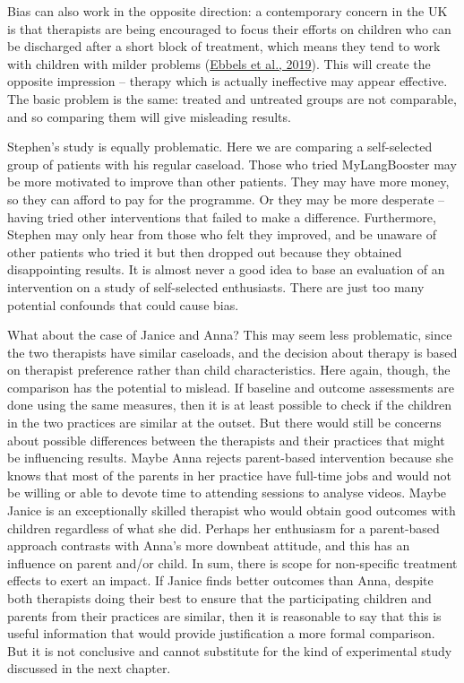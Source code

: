 \documentclass{krantz}
\begin{document}
Bias can also work in the opposite direction: a contemporary concern in the UK is that therapists are being encouraged to focus their efforts on children who can be discharged after a short block of treatment, which means they tend to work with children with milder problems (\protect\hyperlink{ref-ebbels2019}{Ebbels et al., 2019}). This will create the opposite impression -- therapy which is actually ineffective may appear effective. The basic problem is the same: treated and untreated groups are not comparable, and so comparing them will give misleading results.

Stephen's study is equally problematic. Here we are comparing a self-selected group of patients with his regular caseload. Those who tried MyLangBooster may be more motivated to improve than other patients. They may have more money, so they can afford to pay for the programme. Or they may be more desperate -- having tried other interventions that failed to make a difference. Furthermore, Stephen may only hear from those who felt they improved, and be unaware of other patients who tried it but then dropped out because they obtained disappointing results. It is almost never a good idea to base an evaluation of an intervention on a study of self-selected enthusiasts. There are just too many potential confounds that could cause bias.

What about the case of Janice and Anna? This may seem less problematic, since the two therapists have similar caseloads, and the decision about therapy is based on therapist preference rather than child characteristics. Here again, though, the comparison has the potential to mislead. If baseline and outcome assessments are done using the same measures, then it is at least possible to check if the children in the two practices are similar at the outset. But there would still be concerns about possible differences between the therapists and their practices that might be influencing results. Maybe Anna rejects parent-based intervention because she knows that most of the parents in her practice have full-time jobs and would not be willing or able to devote time to attending sessions to analyse videos. Maybe Janice is an exceptionally skilled therapist who would obtain good outcomes with children regardless of what she did. Perhaps her enthusiasm for a parent-based approach contrasts with Anna's more downbeat attitude, and this has an influence on parent and/or child. In sum, there is scope for non-specific treatment effects to exert an impact. If Janice finds better outcomes than Anna, despite both therapists doing their best to ensure that the participating children and parents from their practices are similar, then it is reasonable to say that this is useful information that would provide justification a more formal comparison. But it is not conclusive and cannot substitute for the kind of experimental study discussed in the next chapter.
\end{document}
